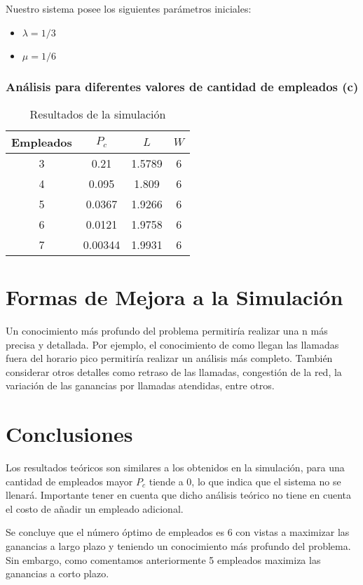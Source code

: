 \documentclass{article}
\begin{document}
Nuestro sistema posee los siguientes parámetros iniciales:
\begin{itemize}
    \item $\lambda = 1/3$
    \item $\mu = 1/6$
\end{itemize}

\subsubsection*{Análisis para diferentes valores de cantidad de empleados (c)}

\begin{table}[H]
    \centering
    \caption{Resultados de la simulación}
    \begin{tabular}{cccc}
        \toprule
        Empleados & $P_c$ & $L$ & $W$ \\
        \midrule
        3 & 0.21 & 1.5789 & 6 \\
        4 & 0.095 & 1.809 & 6 \\
        5 & 0.0367 & 1.9266 & 6 \\
        6 & 0.0121 & 1.9758 & 6 \\
        7 & 0.00344 & 1.9931 & 6 \\
        \bottomrule
    \end{tabular}
\end{table}

\section{Formas de Mejora a la Simulación}
Un conocimiento más profundo del problema permitiría realizar una n más precisa y detallada. Por ejemplo,
el conocimiento de como llegan las llamadas fuera del horario pico permitiría realizar un análisis más completo.
También considerar otros detalles como retraso de las llamadas, congestión de la red, la variación de las ganancias por llamadas atendidas, entre otros.

\section{Conclusiones}
Los resultados teóricos son similares a los obtenidos en la simulación, para una cantidad de empleados mayor $P_c$ tiende a 0, lo que indica que el sistema no se llenará. 
Importante tener en cuenta que dicho análisis teórico no tiene en cuenta el costo de añadir un empleado adicional.

Se concluye que el número óptimo de empleados es 6 con vistas a maximizar las ganancias a largo plazo y teniendo un conocimiento más profundo del problema. 
Sin embargo, como comentamos anteriormente 5 empleados maximiza las ganancias a corto plazo. 
\end{document}
